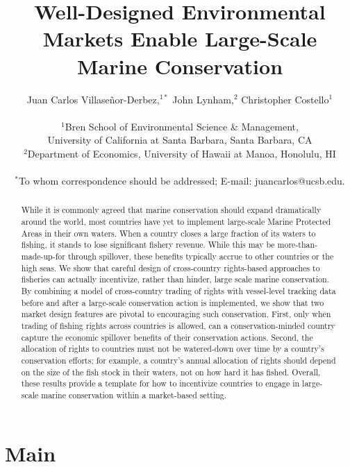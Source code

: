 \documentclass[12pt]{article}
\title{Well-Designed Environmental Markets Enable Large-Scale Marine Conservation}
\author{Juan Carlos Villase\~{n}or-Derbez,$^{1\ast}$ John Lynham,$^{2}$ Christopher Costello$^{1}$\\
\\
\normalsize{$^{1}$Bren School of Environmental Science \& Management,}\\
\normalsize{University of California at Santa Barbara, Santa Barbara, CA}\\
\normalsize{$^{2}$Department of Economics, University of Hawaii at Manoa, Honolulu, HI}\\
\\
\normalsize{$^\ast$To whom correspondence should be addressed; E-mail: juancarlos@ucsb.edu.}
}
\date{}
\begin{document}

\baselineskip24pt


\maketitle



\begin{abstract}
While it is commonly agreed that marine conservation should expand dramatically around the world, most countries have yet to implement large-scale Marine Protected Areas in their own waters. When a country closes a large fraction of its waters to fishing, it stands to lose significant fishery revenue. While this may be more-than-made-up-for through spillover, these benefits typically accrue to other countries or the high seas. We show that careful design of cross-country rights-based approaches to fisheries can actually incentivize, rather than hinder, large scale marine conservation. By combining a model of cross-country trading of rights with vessel-level tracking data before and after a large-scale conservation action is implemented, we show that two market design features are pivotal to encouraging such conservation. First, only when trading of fishing rights across countries is allowed, can a conservation-minded country capture the economic spillover benefits of their conservation actions. Second, the allocation of rights to countries must not be watered-down over time by a country's conservation efforts; for example, a country's annual allocation of rights should depend on the size of the fish stock in their waters, not on how hard it has fished. Overall, these results provide a template for how to incentivize countries to engage in large-scale marine conservation within a market-based setting.
\end{abstract}

\clearpage

\section{Main}
\end{document}
